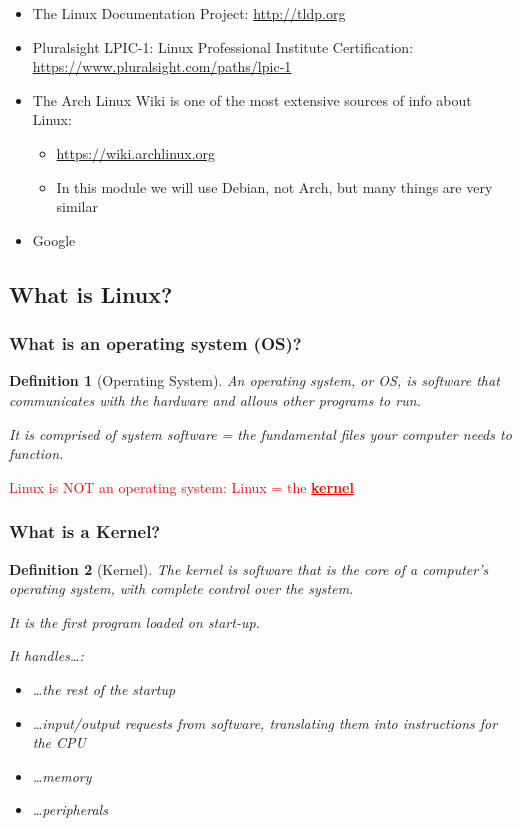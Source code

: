 \documentclass{article}
\newtheorem{theorem}{Definition}[section]
\begin{document}
\begin{itemize}
    \item The Linux Documentation Project: \url{http://tldp.org}
    \item Pluralsight LPIC-1: Linux Professional Institute Certification: \url{https://www.pluralsight.com/paths/lpic-1}
    \item The Arch Linux Wiki is one of the most extensive sources of info about Linux: 
    \begin{itemize}
        \item \url{https://wiki.archlinux.org}
        \item In this module we will use Debian, not Arch, but many things are very similar
    \end{itemize}
    \item Google
\end{itemize}

\subsection{What is Linux?}

\subsubsection{What is an operating system (OS)?}

\begin{theorem}[Operating System]
An operating system, or OS, is software that communicates with the hardware
and allows other programs to run. 

It is comprised of system software = the fundamental files your computer needs to function.
\end{theorem}


\textcolor{red}{Linux is NOT an operating system: Linux = the \underline{\textbf{kernel}}}

\subsubsection{What is a Kernel?}

\begin{theorem}[Kernel]
The kernel is software that is the core of a computer's operating system, with complete control over the system.

It is the first program loaded on start-up. 

It handles\dots: 

\begin{itemize}
    \item \dots the rest of the startup
    \item \dots input/output requests from software, translating them into instructions for the CPU
    \item \dots memory
    \item \dots peripherals
\end{itemize}
\end{theorem}
\end{document}
